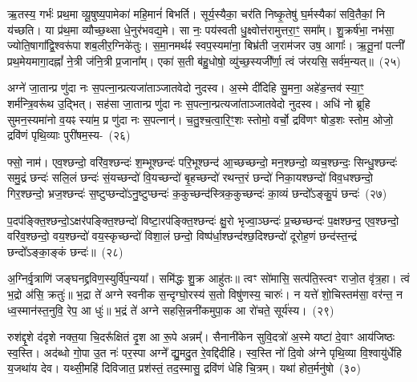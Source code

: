 ऋ॒तस्य॒ गर्भः॑ प्रथ॒मा व्यू॒षुष्य॒पामेका॑ महि॒मानं॑ बिभर्ति। सूर्य॒स्यैका॒ चर॑ति निष्कृ॒तेषु॑ घ॒र्मस्यैका॑ सवि॒तैकां॒ नि य॑च्छति। या प्र॑थ॒मा व्यौच्छ॒थ्सा धे॒नुर॑भवद्य॒मे। सा नः॒ पय॑स्वती धु॒क्ष्वोत्त॑रामुत्तरा॒ꣳ॒ समा᳚म्। शु॒क्रर्\mbox{}ष॑भा॒ नभ॑सा॒ ज्योति॒षागा᳚द्वि॒श्वरू॑पा शब॒लीर॒ग्निके॑तुः। स॒मा॒नमर्थꣴ॑ स्वप॒स्यमा॑ना॒ बिभ्र॑ती ज॒राम॑जर उष॒ आगाः᳚। ऋ॒तू॒नां पत्नी᳚ प्रथ॒मेयमागा॒दह्नां᳚ ने॒त्री ज॑नि॒त्री प्र॒जाना᳚म्। एका॑ स॒ती ब॑हु॒धोषो॒ व्यु॑च्छ॒स्यजी᳚र्णा॒ त्वं ज॑रयसि॒ सर्व॑म॒न्यत्॥~(२५)

{\anuvakamend[{ऊर्ज॒मेका᳚ प्रतिमु॒ञ्चमा॑ना भू॒यास॒मेकं॒ पत्न्येका॒न्नविꣳ॑श॒तिश्च॑}]}%

अग्ने॑ जा॒तान्प्र णु॑दा नः स॒पत्ना॒न्प्रत्यजा॑ताञ्जातवेदो नुदस्व। अ॒स्मे दी॑दिहि सु॒मना॒ अहे॑ड॒न्तव॑ स्या॒ꣳ॒ शर्म॑न्त्रि॒वरू॑थ उ॒द्भित्। सह॑सा जा॒तान्प्र णु॑दा नः स॒पत्ना॒न्प्रत्यजा॑ताञ्जातवेदो नुदस्व। अधि॑ नो ब्रूहि सुमन॒स्यमा॑नो व॒यꣴ स्या॑म॒ प्र णु॑दा नः स॒पत्नान्॑। च॒तु॒श्च॒त्वा॒रि॒ꣳ॒शः स्तोमो॒ वर्चो॒ द्रवि॑णꣳ षोड॒शः स्तोम॒ ओजो॒ द्रवि॑णं पृथि॒व्याः पुरी॑षम॒स्य-~(२६)

फ्सो॒ नाम॑। एव॒श्छन्दो॒ वरि॑व॒श्छन्दः॑ श॒म्भूश्छन्दः॑ परि॒भूश्छन्द॑ आ॒च्छच्छन्दो॒ मन॒श्छन्दो॒ व्यच॒श्छन्दः॒ सिन्धु॒श्छन्दः॑ समु॒द्रं छन्दः॑ सलि॒लं छन्दः॑ सं॒यच्छन्दो॑ वि॒यच्छन्दो॑ बृ॒हच्छन्दो॑ रथन्त॒रं छन्दो॑ निका॒यश्छन्दो॑ विव॒धश्छन्दो॒ गिर॒श्छन्दो॒ भ्रज॒श्छन्दः॑ स॒ष्टुप्छन्दो॑\-ऽनु॒ष्टुप्छन्दः॑ क॒कुच्छन्द॑स्त्रिक॒कुच्छन्दः॑ का॒व्यं छन्दो᳚\-ऽङ्कु॒पं छन्दः॑~(२७)

प॒दप॑ङ्क्ति॒श्छन्दो॒\-ऽक्षर॑पङ्क्ति॒श्छन्दो॑ विष्टा॒रप॑ङ्क्ति॒श्छन्दः॑ क्षु॒रो भृज्वा॒ञ्छन्दः॑ प्र॒च्छच्छन्दः॑ प॒क्षश्छन्द॒ एव॒श्छन्दो॒ वरि॑व॒श्छन्दो॒ वय॒श्छन्दो॑ वय॒स्कृच्छन्दो॑ विशा॒लं छन्दो॒ विष्प॑र्धा॒श्छन्द॑श्छ॒दिश्छन्दो॑ दूरोह॒णं छन्द॑स्त॒न्द्रं छन्दो᳚\-ऽङ्का॒ङ्कं छन्दः॑॥~(२८)

{\anuvakamend[{अ॒स्य॒ङ्कु॒पञ्छन्द॒स्त्रय॑स्त्रिꣳशच्च}]}%

अ॒ग्निर्वृ॒त्राणि॑ जङ्घनद्द्रविण॒स्युर्वि॑प॒न्यया᳚। समि॑द्धः शु॒क्र आहु॑तः॥ त्वꣳ सो॑मासि॒ सत्प॑ति॒स्त्वꣳ राजो॒त वृ॑त्र॒हा। त्वं भ॒द्रो अ॑सि॒ क्रतुः॑॥ भ॒द्रा ते॑ अग्ने स्वनीक स॒न्दृग्घो॒रस्य॑ स॒तो विषु॑णस्य॒ चारुः॑। न यत्ते॑ शो॒चिस्तम॑सा॒ वर॑न्त॒ न ध्व॒स्मान॑स्त॒नुवि॒ रेप॒ आ धुः॑॥ भ॒द्रं ते॑ अग्ने सहसि॒न्ननी॑कमुपा॒क आ रो॑चते॒ सूर्य॑स्य।~(२९)

रुश॑द्दृ॒शे द॑दृशे नक्त॒या चि॒दरू᳚क्षितं दृ॒श आ रू॒पे अन्नम्᳚। सैनानी॑केन सुवि॒दत्रो॑ अ॒स्मे यष्टा॑ दे॒वाꣳ आय॑जिष्ठः स्व॒स्ति। अद॑ब्धो गो॒पा उ॒त नः॑ पर॒स्पा अग्ने᳚ द्यु॒मदु॒त रे॒वद्दि॑दीहि। स्व॒स्ति नो॑ दि॒वो अ॑ग्ने पृथि॒व्या वि॒श्वायु॑र्धेहि य॒जथा॑य देव। यथ्सी॒महि॑ दिविजात॒ प्रश॑स्तं॒ तद॒स्मासु॒ द्रवि॑णं धेहि चि॒त्रम्। यथा॑ होत॒र्मनु॑षो~(३०)

